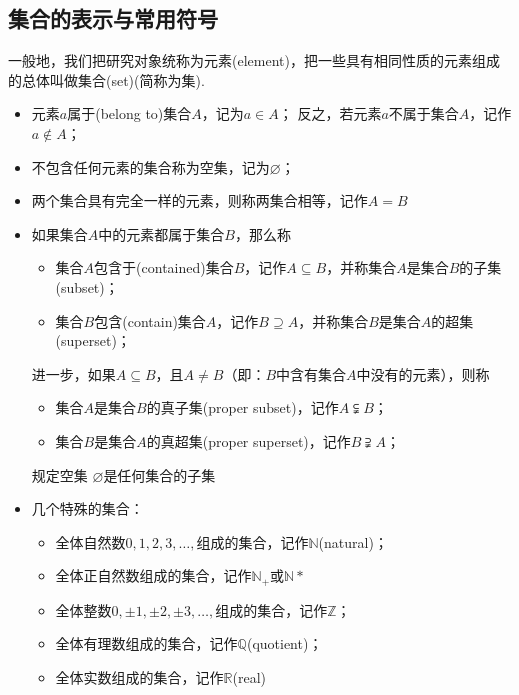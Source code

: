   \subsection{集合的表示与常用符号}
    一般地，我们把研究对象统称为{\fangsong 元素}(element)，把一些具有相同性质的元素组成的总体叫做{\fangsong 集合}(set)(简称为{\fangsong 集}).
    \begin{itemize}
      \item 元素$a${\fangsong 属于}(belong to)集合$A$，记为$a\in A$；
        反之，若元素$a${\fangsong 不属于}集合$A$，记作$a\notin A$；
      \item 不包含任何元素的集合称为{\fangsong 空集}，记为$\varnothing$；
      \item 两个集合具有完全一样的元素，则称两集合{\fangsong 相等}，记作$A=B$
      \item 如果集合$A$中的元素都属于集合$B$，那么称
        \begin{itemize}
          \item 集合$A${\fangsong 包含于}(contained)集合$B$，记作$A\subseteq B$，并称集合$A$是集合$B$的{\fangsong 子集}(subset)；
          \item 集合$B${\fangsong 包含}(contain)集合$A$，记作$B\supseteq A$，并称集合$B$是集合$A$的{\fangsong 超集}(superset)；
        \end{itemize}
        进一步，如果$A\subseteq B$，且$A\neq B$（即：$B$中含有集合$A$中没有的元素），则称
          \begin{itemize}
            \item 集合$A$是集合$B$的{\fangsong 真子集}(proper subset)，记作$A\subsetneqq B$；
            \item 集合$B$是集合$A$的{\fangsong 真超集}(proper superset)，记作$B\supsetneqq A$；
          \end{itemize}
        {\kaishu
          规定空集 $\varnothing$是任何集合的子集
          }
      \item 几个特殊的集合：
        \begin{itemize}
          \item 全体{\fangsong 自然数}$0,1,2,3,\ldots ,$组成的集合，记作$\mathbb{N}$(natural)；
          \item 全体正自然数组成的集合，记作$\mathbb{N}_+$或$\mathbb{N}*$
          \item 全体{\fangsong 整数}$0,\pm1,\pm2,\pm3,\ldots ,$组成的集合，记作$\mathbb{Z}$；
          \item 全体{\fangsong 有理数}组成的集合，记作$\mathbb{Q}$(quotient)；
          \item 全体{\fangsong 实数}组成的集合，记作$\mathbb{R}$(real)

\end{itemize}
\end{itemize}
